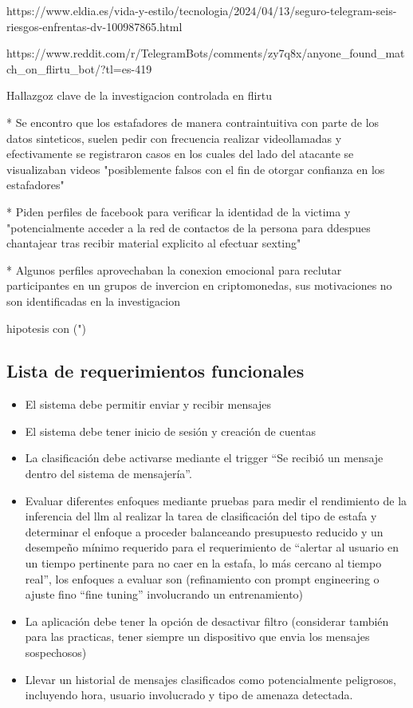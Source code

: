 \documentclass{article}
\begin{document}
https://www.eldia.es/vida-y-estilo/tecnologia/2024/04/13/seguro-telegram-seis-riesgos-enfrentas-dv-100987865.html

https://www.reddit.com/r/TelegramBots/comments/zy7q8x/anyone_found_match_on_flirtu_bot/?tl=es-419


Hallazgoz clave de la investigacion controlada en flirtu

* Se encontro que los estafadores de manera contraintuitiva con parte de los datos sinteticos, suelen pedir con frecuencia realizar videollamadas y efectivamente se registraron casos en los cuales del lado del atacante se visualizaban videos "posiblemente falsos con el fin de otorgar confianza en los estafadores"

* Piden perfiles de facebook para verificar la identidad de la victima y "potencialmente acceder a la red de contactos de la persona para ddespues chantajear tras recibir material explicito al efectuar sexting"

* Algunos perfiles aprovechaban la conexion emocional para reclutar participantes en un grupos de invercion en criptomonedas, sus motivaciones no son identificadas en la investigacion

hipotesis con (")

\subsection{Lista de requerimientos funcionales}

\begin{itemize}[H]
    \item El sistema debe permitir enviar y recibir mensajes
    \item El sistema debe tener inicio de sesión y creación de cuentas
    \item La clasificación debe activarse mediante el trigger “Se recibió un mensaje dentro del sistema de mensajería”.
    \item Evaluar diferentes enfoques mediante pruebas para medir el rendimiento de la inferencia del llm al realizar la tarea de clasificación del tipo de estafa y determinar el enfoque a proceder balanceando presupuesto reducido y un desempeño mínimo requerido para el requerimiento de “alertar al usuario en un tiempo pertinente para no caer en la estafa, lo más cercano al tiempo real”, los enfoques a evaluar son (refinamiento con prompt engineering o ajuste fino “fine tuning” involucrando un entrenamiento)
    \item La aplicación debe tener la opción de desactivar filtro (considerar también para las practicas, tener siempre un dispositivo que envia los mensajes sospechosos)
    \item Llevar un historial de mensajes clasificados como potencialmente peligrosos, incluyendo hora, usuario involucrado y tipo de amenaza detectada.
\end{itemize}
\end{document}
